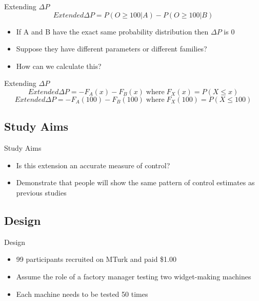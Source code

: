 \documentclass{beamer}
\newcommand{\deltap}{$\Delta P$}
\begin{document}
\begin{frame}{Extending \deltap}
	\begin{displaymath}
	Extended \Delta P = P(O \ge 100|A) - P(O \ge 100|B)
	\end{displaymath}
	\begin{itemize}
		\item If A and B have the exact same probability distribution then \deltap \xspace is 0
		\item Suppose they have different parameters or different families?
		\item How can we calculate this?
	\end{itemize}
\end{frame}
	

\begin{frame}{Extending \deltap}
	\begin{displaymath}
	Extended \Delta P = -F_A(x) - F_B(x) \; \mbox{where} \; F_X(x) = P(X \le x) 
	\end{displaymath}
	\pause
	\begin{displaymath}
	Extended \Delta P = -F_A(100) - F_B(100) \; \mbox{where} \; F_X(100) = P(X \le 100) 
	\end{displaymath}		
\end{frame}	

\subsection*{Study Aims}
\begin{frame}{Study Aims}
	\begin{itemize}
		\item Is this extension an accurate measure of control?
		\item Demonstrate that people will show the same pattern of control estimates as previous studies
	\end{itemize}
\end{frame}

\subsection*{Design}
\begin{frame}{Design}
	\begin{itemize}
		\item 99 participants recruited on MTurk and paid \$1.00
		\item Assume the role of a factory manager testing two widget-making machines
		\item Each machine needs to be tested 50 times
	\end{itemize}
\end{frame}
\end{document}

